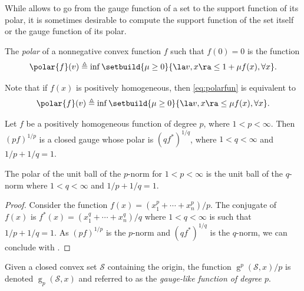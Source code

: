 \documentclass[11pt,twoside,a4paper,openright]{uclouvain-thesis}
\DeclareMathOperator{\gauge}{g}
\begin{document}
While  allows to go from the gauge function of a set to the support function of its polar,
it is sometimes desirable to compute the support function of the set itself or the gauge function of its polar.

\begin{mydef}
  The \emph{polar} of a nonnegative convex function $f$ such that $f(0) = 0$ is the function
  \begin{equation}
    \label{eq:polarfun}
    \polar{f}(v) \triangleq \inf \setbuild{\mu \ge 0}{\la v, x \ra \le 1 + \mu f(x), \forall x}.
  \end{equation}
\end{mydef}

\begin{myrem}
  Note that if $f(x)$ is positively homogeneous, then \eqref{eq:polarfun} is equivalent to
  \begin{equation*}
    \polar{f}(v) \triangleq \inf \setbuild{\mu \ge 0}{\la v, x \ra \le \mu f(x), \forall x}.
  \end{equation*}
\end{myrem}

\begin{myprop}
  \label{prop:gauge-like}
  Let $f$ be a positively homogeneous function of degree $p$, where $1 < p < \infty$.
  Then $(pf)^{1/p}$ is a closed gauge whose polar is $(qf^*)^{1/q}$, where $1 < q < \infty$
  and $1/p + 1/q = 1$.
\end{myprop}

\begin{myprop}
  \label{prop:polarnorm}
  The polar of the unit ball of the $p$-norm for $1 < p < \infty$ is the unit ball of the $q$-norm where $1 < q < \infty$ and $1/p + 1/q = 1$.
  \begin{proof}
    Consider the function $f(x) = (x_1^p + \cdots + x_n^p)/p$.
    The conjugate of $f(x)$ is $f^*(x) = (x_1^q + \cdots + x_n^q)/q$ %
    where $1 < q < \infty$ is such that $1/p + 1/q = 1$.
    As $(pf)^{1/p}$ is the $p$-norm and $(qf^*)^{1/q}$ is the $q$-norm,
    we can conclude with .
  \end{proof}
\end{myprop}

Given a closed convex set $\mathcal{S}$ containing the origin, the function $\gauge^p(\mathcal{S}, x)/p$ is denoted
$\gauge_p(\mathcal{S}, x)$ and referred to as the \emph{gauge-like function of degree $p$}.
\end{document}
